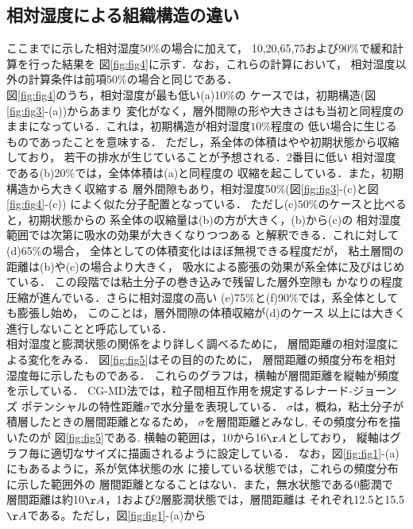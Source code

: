 \subsection{相対湿度による組織構造の違い}
ここまでに示した相対湿度50$\%$の場合に加えて，
10,20,65,75および90$\%$で緩和計算を行った結果を
図\ref{fig:fig4}に示す．なお，これらの計算において，
相対湿度以外の計算条件は前項50$\%$の場合と同じである．\\
\hspace{\parindent}
図\ref{fig:fig4}のうち，相対湿度が最も低い(a)10$\%$の
ケースでは，初期構造(図\ref{fig:fig3}-(a))からあまり
変化がなく，層外間隙の形や大きさはも当初と同程度の
ままになっている．これは，初期構造が相対湿度$10\%$程度の
低い場合に生じるものであったことを意味する．
ただし，系全体の体積はやや初期状態から収縮しており，
若干の排水が生じていることが予想される．2番目に低い
相対湿度である(b)20$\%$では，全体体積は(a)と同程度の
収縮を起こしている．また，初期構造から大きく収縮する
層外間隙もあり，相対湿度50$\%$(図\ref{fig:fig3}-(c)と図\ref{fig:fig4}-(c))
によく似た分子配置となっている．
ただし(c)$50\%$のケースと比べると，初期状態からの
系全体の収縮量は(b)の方が大きく，(b)から(c)の
相対湿度範囲では次第に吸水の効果が大きくなりつつある
と解釈できる．これに対して(d)65$\%$の場合，
全体としての体積変化はほぼ無視できる程度だが，
粘土層間の距離は(b)や(c)の場合より大きく，
吸水による膨張の効果が系全体に及びはじめている．
この段階では粘土分子の巻き込みで残留した層外空隙も
かなりの程度圧縮が進んでいる．さらに相対湿度の高い
(e)75$\%$と(f)90$\%$では，系全体としても膨張し始め，
このことは，層外間隙の体積収縮が(d)のケース
以上には大きく進行しないことと呼応している．\\
\hspace{\parindent}
相対湿度と膨潤状態の関係をより詳しく調べるために，
層間距離の相対湿度による変化をみる．
図\ref{fig:fig5}はその目的のために，
層間距離の頻度分布を相対湿度毎に示したものである．
これらのグラフは，横軸が層間距離を縦軸が頻度を示している．
CG-MD法では，粒子間相互作用を規定するレナード-ジョーンズ
ポテンシャルの特性距離$\sigma$で水分量を表現している．
$\sigma$は，概ね，粘土分子が積層したときの層間距離となるため，
$\sigma$を層間距離とみなし, その頻度分布を描いたのが
図\ref{fig:fig5}である. 横軸の範囲は，10から16$\AA$としており，
縦軸はグラフ毎に適切なサイズに描画されるように設定している．
なお，図\ref{fig:fig1}-(a)にもあるように，系が気体状態の水
に接している状態では，これらの頻度分布に示した範囲外の
層間距離となることはない．また，無水状態である0膨潤で
層間距離は約10$\AA$，1および2層膨潤状態では，層間距離は
それぞれ12.5と15.5$\AA$である。ただし，図\ref{fig:fig1}-(a)から

